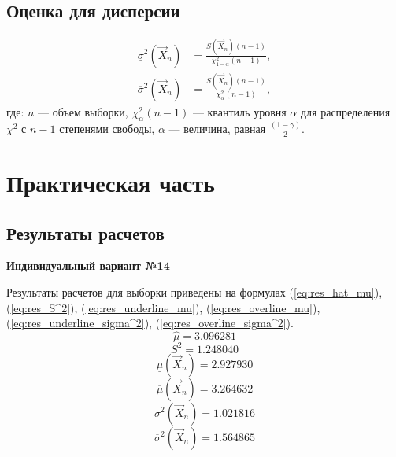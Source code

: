 \section{Оценка для дисперсии}

\begin{align}
	\underline\sigma^2(\vec X_n) & = \frac{S(\vec X_n)(n-1)}{\chi_{1-\alpha}^2(n-1)},\\
	\overline\sigma^2(\vec X_n)  & = \frac{S(\vec X_n)(n-1)}{\chi_{\alpha}^2(n-1)},
\end{align}
где: $n$ — объем выборки, $\chi_{\alpha}^2(n-1)$ — квантиль уровня $\alpha$ для распределения $\chi^{2}$ с $n-1$ степенями свободы, $\alpha$ — величина, равная $\frac{(1-\gamma)}2$.

\pagebreak

\chapter{Практическая часть}

\section{Результаты расчетов}
\textbf{Индивидуальный вариант №14}

Результаты расчетов для выборки приведены на формулах (\ref{eq:res_hat_mu}), (\ref{eq:res_S^2}), (\ref{eq:res_underline_mu}), (\ref{eq:res_overline_mu}), (\ref{eq:res_underline_sigma^2}), (\ref{eq:res_overline_sigma^2}).
\begin{equation}
	\label{eq:res_hat_mu}
	\hat\mu = 3.096281
\end{equation}
\begin{equation}
	\label{eq:res_S^2}
	S^2 = 1.248040
\end{equation}
\begin{equation}
	\label{eq:res_underline_mu}
	\underline\mu(\vec X_n) = 2.927930
\end{equation}
\begin{equation}
	\label{eq:res_overline_mu}
	\overline\mu(\vec X_n) = 3.264632
\end{equation}
\begin{equation}
	\label{eq:res_underline_sigma^2}
	\underline\sigma^2(\vec X_n) = 1.021816
\end{equation}
\begin{equation}
	\label{eq:res_overline_sigma^2}
	\overline\sigma^2(\vec X_n) = 1.564865
\end{equation}

